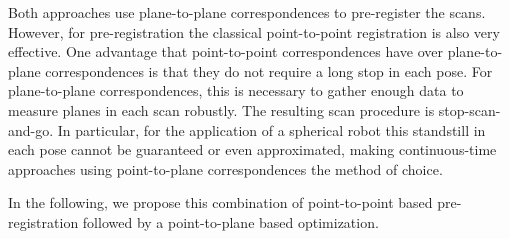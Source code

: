 Both approaches use plane-to-plane correspondences to pre-register the scans.
However, for pre-registration the classical point-to-point registration is also very effective. 
One advantage that point-to-point correspondences have over plane-to-plane correspondences is that they do not require a long stop in each pose.
For plane-to-plane correspondences, this is necessary to gather enough data to measure planes in each scan robustly.
The resulting scan procedure is stop-scan-and-go.
In particular, for the application of a spherical robot this standstill in each pose cannot be guaranteed or even approximated, making continuous-time approaches using point-to-plane correspondences the method of choice.

In the following, we propose this combination of point-to-point based pre-registration followed by a point-to-plane based optimization. 
